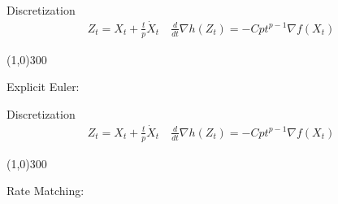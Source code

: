 \documentclass{beamer}
\begin{document}
\begin{frame}[t]{Discretization}
\small
    \begin{align}
        Z_t=X_t+\frac{t}{p}\dot X_t\quad \frac{d}{dt}\nabla h(Z_t)=-Cpt^{p-1}\nabla f(X_t)
    \end{align}
    \begin{center}
\line(1,0){300}
\end{center}
    Explicit Euler:
\end{frame}


\begin{frame}[t]{Discretization}
\small
    \begin{align}
        Z_t=X_t+\frac{t}{p}\dot X_t\quad \frac{d}{dt}\nabla h(Z_t)=-Cpt^{p-1}\nabla f(X_t)
    \end{align}
    \begin{center}
\line(1,0){300}
\end{center}
    Rate Matching:
\end{frame}
\end{document}
